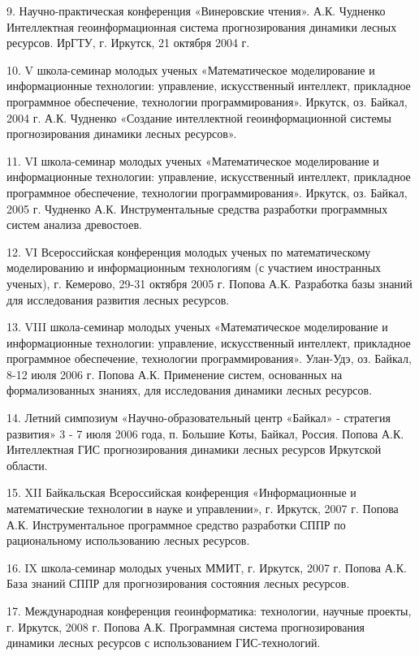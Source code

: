 \documentclass{article}
\begin{document}
9. Научно-практическая конференция «Винеровские 
чтения». А.К. Чудненко Интеллектная геоинформационная 
система прогнозирования динамики лесных ресурсов. 
ИрГТУ, г. Иркутск, 21 октября 2004 г.

10. V школа-семинар молодых ученых «Математическое 
моделирование и информационные технологии: 
управление, искусственный интеллект, прикладное 
программное обеспечение, технологии программирования». 
 Иркутск, оз. Байкал, 2004 г. А.К. Чудненко «Создание 
интеллектной геоинформационной системы прогнозирования 
динамики лесных ресурсов».

11. VI школа-семинар молодых ученых «Математическое 
моделирование и информационные технологии: 
управление, искусственный интеллект, прикладное 
программное обеспечение, технологии программирования». 
Иркутск, оз. Байкал, 2005 г. Чудненко А.К. Инструментальные 
средства разработки программных систем анализа 
древостоев. 

12. VI Всероссийская конференция молодых ученых 
по математическому моделированию и информационным 
технологиям (с участием иностранных ученых), 
г. Кемерово, 29-31 октября 2005 г. Попова А.К. Разработка 
базы знаний для исследования развития лесных 
ресурсов.

13. VIII школа-семинар молодых ученых «Математическое 
моделирование и информационные технологии: 
управление, искусственный интеллект, прикладное 
программное обеспечение, технологии программирования». 
Улан-Удэ, оз. Байкал, 8-12 июля 2006 г. Попова А.К. 
Применение систем, основанных на формализованных 
знаниях, для исследования динамики лесных ресурсов.

14. Летний симпозиум «Научно-образовательный 
центр «Байкал» - стратегия развития» 3 - 7 июля 
2006  года, п. Большие Коты, Байкал, Россия. Попова 
А.К. Интеллектная ГИС прогнозирования динамики 
лесных ресурсов Иркутской области.

15. XII Байкальская Всероссийская конференция 
«Информационные и математические технологии 
в науке и управлении», г. Иркутск, 2007 г. Попова 
А.К. Инструментальное программное средство 
разработки СППР по рациональному использованию 
лесных ресурсов. 

16. IX школа-семинар молодых ученых ММИТ, г. Иркутск, 
2007 г. Попова А.К. База знаний СППР для прогнозирования 
состояния лесных ресурсов. 

17. Международная конференция геоинформатика: 
технологии, научные проекты, г. Иркутск, 2008 г. 
Попова А.К. Программная система прогнозирования 
динамики лесных ресурсов с использованием 
ГИС-технологий. 
\end{document}
